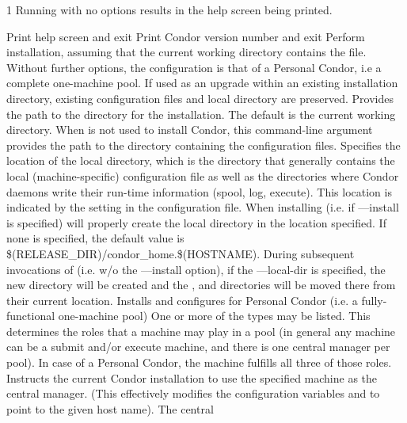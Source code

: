 \begin{ManPage}{\label{man-condor-configure}}{1}
Running  with no options results in the
help screen being printed.

\begin{Options}
	 {Print help screen and exit}
	 {Print Condor version number and exit}
	 {Perform installation, assuming that
	the current working directory contains the 
	file.  Without further options, the configuration is that of
	a Personal Condor, i.e a complete one-machine pool.  If used as an 
	upgrade within an existing installation directory, existing 
	configuration files and local directory are preserved.}
	 {Provides the path to the
	directory for the installation.  The default is the current
	working directory.  When  is not used to
	install Condor, this command-line argument provides the path
	to the directory containing the configuration files.}
	 {Specifies the
	location of the local directory, which is the directory that generally 
	contains the local (machine-specific) configuration file as well as the
	directories where Condor daemons write their run-time information 
	(spool, log, execute). This location is indicated  by the  
	setting in the configuration file. 
	When installing (i.e. if ---install is specified)  
	will properly create the local directory in the location specified. If
	none is specified, the default value is \$(RELEASE\_DIR)/condor\_home.\$(HOSTNAME).
	During subsequent invocations of  (i.e. w/o the 
	---install option), if the ---local-dir is specified, the new directory
	will be created and the ,  and  
	directories will be moved there from their current location.}
	 {Installs and configures for 
	  Personal Condor (i.e. a fully-functional one-machine pool)}
	 {One
	or more of the types may be listed.
	This determines the roles that a machine may play in a pool (in general any
	machine can be a submit and/or execute machine, and there is one central manager
	per pool). In case of a Personal Condor, the machine fulfills all three of those
	roles.}
	 {Instructs the current
	Condor installation to use the specified machine as the central manager. 
	(This effectively modifies the configuration variables 
	and  to point to the given host name). The central \
}
\end{Options}
\end{ManPage}
